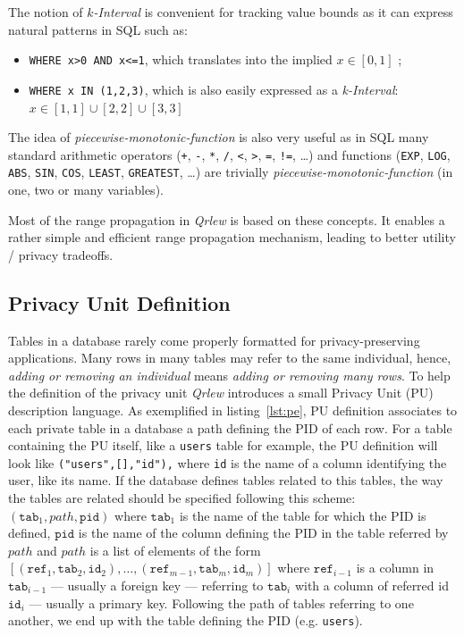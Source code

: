 \documentclass[letterpaper]{article} %
\newcommand{\qrlew}{\emph{Qrlew}}
\begin{document}
The notion of \emph{$k$-Interval} is convenient for tracking value bounds as it can express natural patterns in SQL such as:
\begin{itemize}
    \item \texttt{WHERE x>0 AND x<=1}, which translates into the implied $x\in \left[0, 1\right]$ ;
    \item \texttt{WHERE x IN (1,2,3)}, which is also easily expressed as a \emph{k-Interval}: $x \in \left[1, 1\right] \cup \left[2, 2\right] \cup \left[3, 3\right]$
\end{itemize}

The idea of \emph{piecewise-monotonic-function} is also very useful as in SQL many standard arithmetic operators (\texttt{+}, \texttt{-}, \texttt{*}, \texttt{/}, \texttt{<}, \texttt{>}, \texttt{=}, \texttt{!=}, \ldots) and functions (\texttt{EXP}, \texttt{LOG}, \texttt{ABS}, \texttt{SIN}, \texttt{COS}, \texttt{LEAST}, \texttt{GREATEST}, \ldots) are trivially \emph{piecewise-monotonic-function} (in one, two or many variables).

Most of the range propagation in \qrlew{} is based on these concepts. It enables a rather simple and efficient range propagation mechanism, leading to better utility / privacy tradeoffs.

\subsection{Privacy Unit Definition}
\label{sec:privacy_unit_definition}

Tables in a database rarely come properly formatted for privacy-preserving applications. Many rows in many tables may refer to the same individual, hence, \emph{adding or removing an individual} means \emph{adding or removing many rows}. To help the definition of the privacy unit \qrlew{} introduces a small Privacy Unit (PU) description language.
As exemplified in listing~\ref{lst:pe}, PU definition associates to each private table in a database a path defining the PID of each row. For a table containing the PU itself, like a \texttt{users} table for example, the PU definition will look like \texttt{("users",[],"id"),} where \texttt{id} is the name of a column identifying the user, like its name. If the database defines tables related to this tables, the way the tables are related should be specified following this scheme: $(\mathtt{tab}_1, path, \mathtt{pid})$ where $\mathtt{tab}_1$ is the name of the table for which the PID is defined, $\mathtt{pid}$ is the name of the column defining the PID in the table referred by $path$ and $path$ is a list of elements of the form $[(\mathtt{ref}_1, \mathtt{tab}_2, \mathtt{id}_2),\ldots, (\mathtt{ref}_{m-1}, \mathtt{tab}_m, \mathtt{id}_m)]$
where $\mathtt{ref}_{i-1}$ is a column in $\mathtt{tab}_{i-1}$ --- usually a foreign key --- referring to $\mathtt{tab}_i$ with a column of referred id $\mathtt{id}_i$ --- usually a primary key. Following the path of tables referring to one another, we end up with the table defining the PID (e.g. \texttt{users}).
\end{document}
